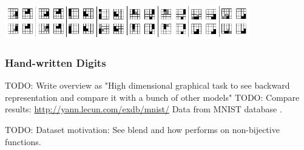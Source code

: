 \begin{center} 
\includegraphics[width=0.8\textwidth]{img/cbva_back_repre.png} \citep{farkas2013bal}
\end{center} 

\subsubsection{Hand-written Digits} 
\label{sec:datasets-digits} 

TODO: Write overview as "High dimensional graphical task to see backward representation and compare it with a bunch of other models" 
TODO: Compare results: \url{http://yann.lecun.com/exdb/mnist/} 
Data from MNIST database \citet{lecun1998gradient}. 

TODO: Dataset motivation: See blend and how performs on non-bijective functions. 

